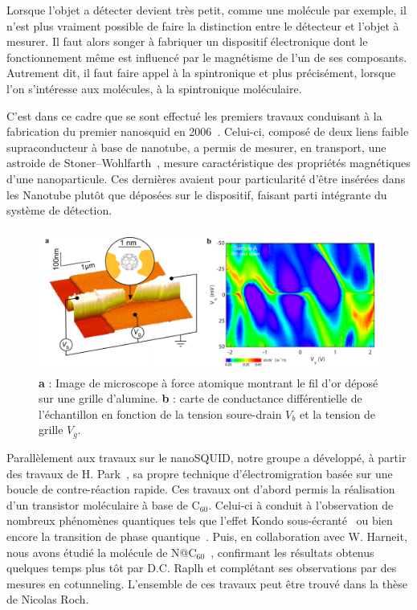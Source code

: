 Lorsque l'objet a détecter devient très petit, comme une molécule par exemple, il n'est plus vraiment possible de faire la distinction entre le détecteur et l'objet à mesurer. Il faut alors songer à fabriquer un dispositif électronique dont le fonctionnement même est influencé par le magnétisme de l'un de ses composants. Autrement dit, il faut faire appel à la spintronique et plus précisément, lorsque l'on s'intéresse aux molécules, à la spintronique moléculaire.

C'est dans ce cadre que se sont effectué les premiers travaux conduisant à la fabrication du premier nanosquid en 2006~\cite{CleuziouJ.-P.2006}. Celui-ci,  composé de deux liens faible supraconducteur à base de nanotube, a permis de mesurer, en transport, une astroide de Stoner–Wohlfarth~\cite{Cleuziou2011}, mesure caractéristique des propriétés magnétiques d'une nanoparticule. Ces dernières avaient pour particularité d'être insérées dans les Nanotube plutôt que déposées sur le dispositif, faisant parti intégrante du système de détection.

\begin{figure}
\centering \includegraphics[scale=0.45]{Spintronique/RochC60/RochC60.pdf}
\caption{\textbf{a} : Image de microscope à force atomique montrant le fil d'or déposé sur une grille d'alumine. \textbf{b} : carte de conductance différentielle de l'échantillon en fonction de la tension soure-drain $V_b$ et la tension de grille $V_g$.}
\label{RochC60}
\end{figure}


Parallèlement aux travaux sur le nanoSQUID, notre groupe a développé, à partir des travaux de H. Park~\cite{Park1999}, sa propre technique d'électromigration basée sur une boucle de contre-réaction rapide. Ces travaux ont d'abord permis la réalisation d'un transistor moléculaire à base de C$_{60}$. Celui-ci à conduit à l'observation de nombreux phénomènes quantiques tels que l'effet Kondo sous-écranté~\cite{Roch2009} ou bien encore la transition de phase quantique~\cite{Roch2008}. Puis, en collaboration avec W. Harneit, nous avons étudié la molécule de N@C$_{60}$~\cite{Roch2011}, confirmant les résultats obtenus quelques temps plus tôt par D.C. Raplh et complétant ses observations par des mesures en cotunneling. L'ensemble de ces travaux peut être trouvé dans la thèse de Nicolas Roch.

